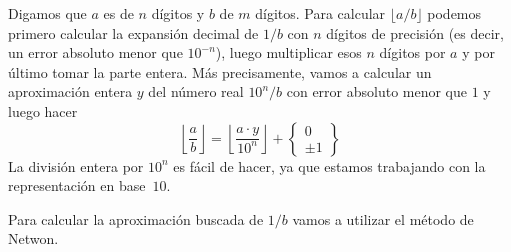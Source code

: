 \documentclass[a4paper, 11pt]{article}
\theoremstyle{plain}
\theoremstyle{definition}
\begin{document}
Digamos que $a$ es de $n$ dígitos y $b$ de $m$ dígitos. Para calcular
$\lfloor a/b\rfloor$ podemos primero calcular la expansión decimal de $1/b$
con $n$ dígitos de precisión (es decir, un error absoluto menor que $10^{-n}$),
luego multiplicar esos $n$ dígitos por $a$ y por último tomar la parte
entera. Más precisamente, vamos a calcular un aproximación entera $y$ del
número real $10^n/b$ con error absoluto menor que $1$ y luego hacer
\[
   \left\lfloor\frac{a}{b}\right\rfloor=
   \left\lfloor
       \frac{a\cdot y}
            {10^{n}}
   \right\rfloor+\left\{
     \begin{array}{c} 0 \\ \pm1 \end{array}
   \right\}
\]
La división entera por $10^n$ es fácil de hacer, ya que estamos trabajando
con la representación en base~$10$.

\bigskip

Para calcular la aproximación buscada de $1/b$ vamos a utilizar el 
método de Netwon.
\end{document}
